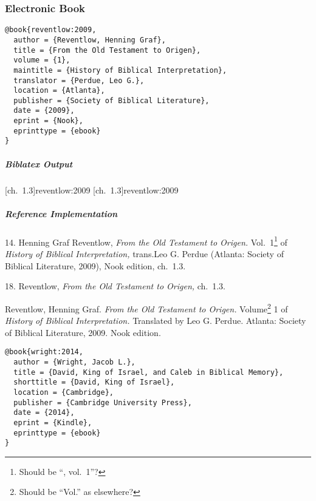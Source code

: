 \documentclass[a4paper]{article}
\newenvironment{biboutput}{%
  \subparagraph{Biblatex Output}
}{\color{black}}
\newenvironment{refimp}{%
  \subparagraph{Reference Implementation}
  \color{reference-colour}
  \rm
}{\par\color{black}}
\begin{document}
\subsubsection{Electronic Book}

\begin{lstlisting}
@book{reventlow:2009,
  author = {Reventlow, Henning Graf},
  title = {From the Old Testament to Origen},
  volume = {1},
  maintitle = {History of Biblical Interpretation},
  translator = {Perdue, Leo G.},
  location = {Atlanta},
  publisher = {Society of Biblical Literature},
  date = {2009},
  eprint = {Nook},
  eprinttype = {ebook}
}
\end{lstlisting}

\begin{biboutput}
  [ch.~1.3]{reventlow:2009}
  [ch.~1.3]{reventlow:2009}
\end{biboutput}

\begin{refimp}
  \hspace*{\bibindent}14. Henning Graf Reventlow, \emph{From the Old Testament
  to Origen.} Vol.~1\footnote{Should be “, vol.~1”?} of \emph{History of
  Biblical Interpretation,} trans.\@ Leo G. Perdue (Atlanta: Society of
  Biblical Literature, 2009), Nook edition, ch.~1.3.

  \hspace*{\bibindent}18. Reventlow, \emph{From the Old Testament to Origen,}
  ch.~1.3.
  
  \hangindent\bibindent Reventlow, Henning Graf. \emph{From the Old Testament
  to Origen.} Volume\footnote{Should be “Vol.” as elsewhere?} 1 of
  \emph{History of Biblical Interpretation.} Translated by Leo G. Perdue.
  Atlanta: Society of Biblical Literature, 2009. Nook edition.
\end{refimp}

\medskip

\begin{lstlisting}
@book{wright:2014,
  author = {Wright, Jacob L.},
  title = {David, King of Israel, and Caleb in Biblical Memory},
  shorttitle = {David, King of Israel},
  location = {Cambridge},
  publisher = {Cambridge University Press},
  date = {2014},
  eprint = {Kindle},
  eprinttype = {ebook}
}
\end{lstlisting}
\end{document}
